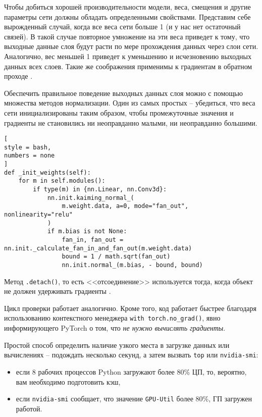 \documentclass[%
	11pt,
	a4paper,
	utf8,
		]{article}
\begin{document}
Чтобы добиться хорошей производительности модели, веса, смещения и другие параметры сети должны обладать определенными свойствами. Представим себе вырожденный случай, когда все веса сети больше 1 (и у нас нет остаточный связей). В такой случае повторное умножение на эти веса приведет к тому, что выходные данные слоя будут расти по мере прохождения данных через слои сети. Аналогично, вес меньшей 1 приведет к уменьшению и исчезновению выходных данных всех слоев. Такие же соображения применимы к градиентам в обратном проходе \cite[]{pytorch-2022}.

Обеспечить правильное поведение выходных данных слоя можно с помощью множества методов нормализации. Один из самых простых -- убедиться, что веса сети инициализированы таким образом, чтобы промежуточные значения и градиенты не становились ни неоправданно малыми, ни неоправданно большими. 
\begin{lstlisting}[
style = bash,
numbers = none
]
def _init_weights(self):
    for m in self.modules():
        if type(m) in {nn.Linear, nn.Conv3d}:
            nn.init.kaiming_normal_(
                m.weight.data, a=0, mode="fan_out", nonlinearity="relu"
            )
            if m.bias is not None:
                fan_in, fan_out = nn.init._calculate_fan_in_and_fan_out(m.weight.data)
                bound = 1 / math.sqrt(fan_out)
                nn.init.normal_(m.bias, - bound, bound)
\end{lstlisting}

Метод \verb|.detach()|, то есть <<отсоединение>> используется тогда, когда объект не должен удерживать градиенты \cite[]{pytorch-2022}.

Цикл проверки работает аналогично. Кроме того, код работает быстрее благодаря использованию контекстного менеджера \verb|with torch.no_grad()|, явно информирующего PyTorch о том, что \emph{не нужно вычислять градиенты}.

Простой способ определить наличие узкого места в загрузке данных или вычислениях -- подождать несколько секунд, а затем вызвать \verb|top| или \verb|nvidia-smi|:
\begin{itemize}
	\item если 8 рабочих процессов Python загружают более 80\% ЦП, то, вероятно, вам необходимо подготовить кэш,
	
	\item если \verb|nvidia-smi| сообщает, что значение \verb|GPU-Util| более 80\%, ГП загружен работой.
\end{itemize}
\end{document}
